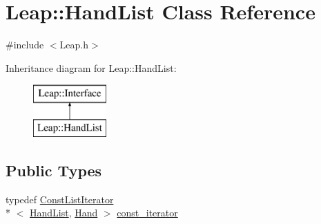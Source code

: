 \hypertarget{class_leap_1_1_hand_list}{\section{Leap\+:\+:Hand\+List Class Reference}
\label{class_leap_1_1_hand_list}
}


{\ttfamily \#include $<$Leap.\+h$>$}

Inheritance diagram for Leap\+:\+:Hand\+List\+:\begin{figure}[H]
\begin{center}
\leavevmode
\includegraphics[height=2.000000cm]{class_leap_1_1_hand_list}
\end{center}
\end{figure}
\subsection*{Public Types}
\begin{DoxyCompactItemize}
\item 
typedef \hyperlink{class_leap_1_1_const_list_iterator}{Const\+List\+Iterator}\\*
$<$ \hyperlink{class_leap_1_1_hand_list}{Hand\+List}, \hyperlink{class_leap_1_1_hand}{Hand} $>$ \hyperlink{class_leap_1_1_hand_list_a9c35a4db8fd94a3b1a029efecbd13668}{const\+\_\+iterator}
\end{DoxyCompactItemize}

